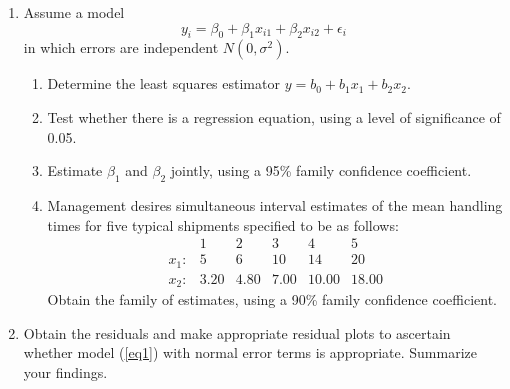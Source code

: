 \documentclass[a4paper]{amsart}
\numberwithin{equation}{section}
\numberwithin{figure}{section}
\theoremstyle{definition}
\begin{document}
\begin{enumerate}
\item Assume a model
\begin{equation}
y_i = \beta_0+\beta_1x_{i1} + \beta_2 x_{i2} +\epsilon_i
\label{eq1}
\end{equation}
in which errors are independent $N(0,\sigma^2)$.
\begin{enumerate}

\item Determine the least squares estimator $y=b_0+b_1x_1 + b_2x_2$.

\item Test whether there is a regression equation, using a level of significance of 0.05.

\item Estimate $\beta_1$ and $\beta_2$ jointly, using a 95\% family confidence coefficient.

\item Management desires simultaneous interval estimates of the mean handling times for five typical shipments specified to be as follows:
$$\begin{array}{r|lllll}
&1 &2 &3 &4 &5\\
\hline x_1: &5 &6 &10 &14 &20\\
x_2: &3.20 &4.80 &7.00 &10.00 &18.00
\end{array}$$
Obtain the family of estimates, using a 90\% family confidence coefficient.
\end{enumerate}


\item Obtain the residuals and make appropriate residual plots to ascertain whether model (\ref{eq1}) with normal error terms is appropriate. Summarize your findings.
\end{enumerate}
\end{document}
